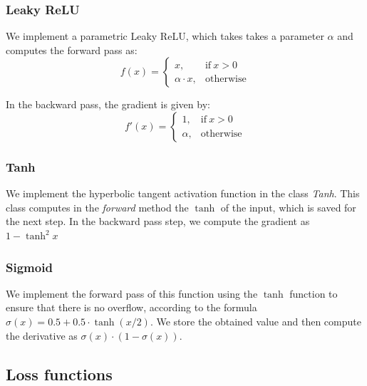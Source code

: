 \documentclass[10pt,conference,compsocconf]{IEEEtran}
\begin{document}
  	\subsubsection{Leaky ReLU} %
  	\label{ssub:leakyrelu}
        We implement a parametric Leaky ReLU, which takes takes a parameter $\alpha$ and computes the forward pass as:
      	\begin{equation} 
            f(x)=
            \begin{cases}
              x, & \text{if}\ x>0 \\
              \alpha\cdot x, & \text{otherwise}
            \end{cases}
        \end{equation}
    
        In the backward pass, the gradient is given by:
      	\begin{equation} 
            f'(x)=
            \begin{cases}
              1, & \text{if}\ x>0 \\
               \alpha, & \text{otherwise}
            \end{cases}
        \end{equation}
  	
  	\subsubsection{Tanh} %
  	\label{ssub:tanh}
        We implement the hyperbolic tangent activation function in the class \textit{Tanh}. This class computes in the \textit{forward} method the $\tanh$ of the input, which is saved for the next step. In the backward pass step, we compute the gradient as $1-\tanh^2{x}$
  	\subsubsection{Sigmoid} %
  	\label{ssub:sigmoid}
        We implement the forward pass of this function using the $\tanh$ function to ensure that there is no overflow, according to the formula $\sigma(x) = 0.5 + 0.5\cdot\tanh{(x/2)}$. We store the obtained value and then compute the derivative as $\sigma(x) \cdot (1-\sigma(x))$. 
  \subsection{Loss functions} %
  \label{sub:loss_functions}
  
\end{document}
